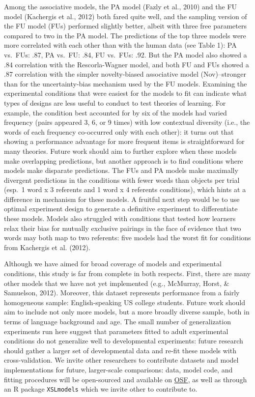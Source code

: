 \documentclass[10pt, letterpaper]{article}
\begin{document}
Among the associative models, the PA model (Fazly et al., 2010) and the
FU model (Kachergis et al., 2012) both fared quite well, and the
sampling version of the FU model (FUs) performed slightly better, albeit
with three free parameters compared to two in the PA model. The
predictions of the top three models were more correlated with each other
than with the human data (see Table 1): PA vs.~FUs: .87, PA vs.~FU: .84,
FU vs.~FUs: .92. But the PA model also showed a .84 correlation with the
Rescorla-Wagner model, and both FU and FUs showed a .87 correlation with
the simpler novelty-biased associative model (Nov)--stronger than for
the uncertainty-bias mechanism used by the FU models. Examining the
experimental conditions that were easiest for the models to fit can
indicate what types of designs are less useful to conduct to test
theories of learning. For example, the condition best accounted for by
six of the models had varied frequency (pairs appeared 3, 6, or 9 times)
with low contextual diversity (i.e., the words of each frequency
co-occurred only with each other): it turns out that showing a
performance advantage for more frequent items is straightforward for
many theories. Future work should aim to further explore when these
models make overlapping predictions, but another approach is to find
conditions where models make disparate predictions. The FUs and PA
models make maximally divergent predictions in the conditions with fewer
words than objects per trial (esp.~1 word x 3 referents and 1 word x 4
referents conditions), which hints at a difference in mechanism for
these models. A fruitful next step would be to use optimal experiment
design to generate a definitive experiment to differentiate these
models. Models also struggled with conditions that tested how learners
relax their bias for mutually exclusive pairings in the face of evidence
that two words may both map to two referents: five models had the worst
fit for conditions from Kachergis et al. (2012).

Although we have aimed for broad coverage of models and experimental
conditions, this study is far from complete in both respects. First,
there are many other models that we have not yet implemented (e.g.,
McMurray, Horst, \& Samuelson, 2012). Moreover, this dataset represents
performance from a fairly homogeneous sample: English-speaking US
college students. Future work should aim to include not only more
models, but a more broadly diverse sample, both in terms of language
background and age. The small number of generalization experiments run
here suggest that parameters fitted to adult experimental conditions do
not generalize well to developmental experiments: future research should
gather a larger set of developmental data and re-fit these models with
cross-validation. We invite other researchers to contribute datasets and
model implementations for future, larger-scale comparisons: data, model
code, and fitting procedures will be open-sourced and available on
\href{https://osf.io/s2aty/?view_only=c91c852f00b847e0a71d5f4deaf7b7a5}{OSF},
as well as through an R package \texttt{XSLmodels} which we invite other
to contribute to.
\end{document}
